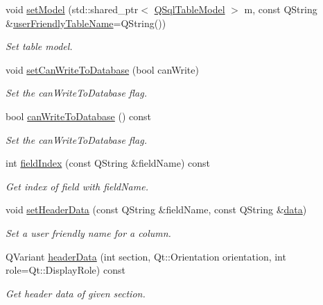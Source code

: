\begin{DoxyCompactItemize}
void \hyperlink{classmdt_abstract_sql_table_controller_ac9e64cf30e552ec65ed5fdd861320676}{set\-Model} (std\-::shared\-\_\-ptr$<$ \hyperlink{class_q_sql_table_model}{Q\-Sql\-Table\-Model} $>$ m, const Q\-String \&\hyperlink{classmdt_abstract_sql_table_controller_a1a9b3d3e4009acd32fc4a083f738fc62}{user\-Friendly\-Table\-Name}=Q\-String())
\begin{DoxyCompactList}\small\item\em Set table model. \end{DoxyCompactList}\item 
void \hyperlink{classmdt_abstract_sql_table_controller_a51f1f0be0e906cbd4aff671aac3945a4}{set\-Can\-Write\-To\-Database} (bool can\-Write)
\begin{DoxyCompactList}\small\item\em Set the can\-Write\-To\-Database flag. \end{DoxyCompactList}\item 
bool \hyperlink{classmdt_abstract_sql_table_controller_a118eb88b5cda87933f63bfa699d845dd}{can\-Write\-To\-Database} () const 
\begin{DoxyCompactList}\small\item\em Set the can\-Write\-To\-Database flag. \end{DoxyCompactList}\item 
int \hyperlink{classmdt_abstract_sql_table_controller_a8cdca2d31b1129caa20cf5a0e583f068}{field\-Index} (const Q\-String \&field\-Name) const 
\begin{DoxyCompactList}\small\item\em Get index of field with field\-Name. \end{DoxyCompactList}\item 
void \hyperlink{classmdt_abstract_sql_table_controller_a21621bf5eb35b430c8bfd1b1c5ad7607}{set\-Header\-Data} (const Q\-String \&field\-Name, const Q\-String \&\hyperlink{classmdt_abstract_sql_table_controller_a1801a01c0ce073c2e389b20f58a3d3ff}{data})
\begin{DoxyCompactList}\small\item\em Set a user friendly name for a column. \end{DoxyCompactList}\item 
Q\-Variant \hyperlink{classmdt_abstract_sql_table_controller_a904e6bdf3a69e755ee9fd2239bea576f}{header\-Data} (int section, Qt\-::\-Orientation orientation, int role=Qt\-::\-Display\-Role) const 
\begin{DoxyCompactList}\small\item\em Get header data of given section. \end{DoxyCompactList}\item 

\end{DoxyCompactItemize}
